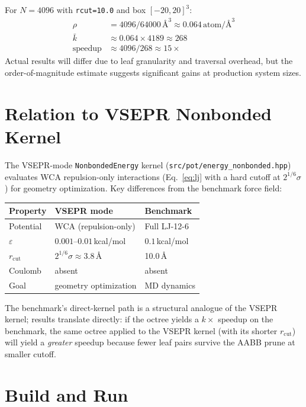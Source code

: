 \documentclass[11pt,a4paper]{article}
\theoremstyle{definition}
\theoremstyle{plain}
\newcommand{\rcut}{r_{\mathrm{cut}}}
\newcommand{\eps}{\varepsilon}
\begin{document}
For $N = 4096$ with \texttt{rcut=10.0} and box $[-20,20]^3$:
\begin{align*}
  \rho &= 4096 / 64000\,\text{\AA}^3 \approx 0.064\,\text{atom/\AA}^3 \\
  \bar{k} &\approx 0.064 \times 4189 \approx 268 \\
  \text{speedup} &\approx 4096 / 268 \approx 15\times
\end{align*}
Actual results will differ due to leaf granularity and traversal overhead,
but the order-of-magnitude estimate suggests significant gains at production
system sizes.

\section{Relation to VSEPR Nonbonded Kernel}
\label{sec:vsepr}

The VSEPR-mode \texttt{NonbondedEnergy} kernel
(\texttt{src/pot/energy\_nonbonded.hpp}) evaluates WCA repulsion-only
interactions (Eq.~\ref{eq:lj} with a hard cutoff at $2^{1/6}\sigma$) for
geometry optimization.  Key differences from the benchmark force field:

\begin{center}
\begin{tabular}{lll}
\toprule
Property & VSEPR mode & Benchmark \\
\midrule
Potential  & WCA (repulsion-only) & Full LJ-12-6 \\
$\eps$     & $0.001$–$0.01$\,kcal/mol & $0.1$\,kcal/mol \\
$\rcut$    & $2^{1/6}\sigma \approx 3.8$\,\AA & 10.0\,\AA \\
Coulomb    & absent & absent \\
Goal       & geometry optimization & MD dynamics \\
\bottomrule
\end{tabular}
\end{center}

The benchmark's direct-kernel path is a structural analogue of the VSEPR
kernel; results translate directly: if the octree yields a $k\times$
speedup on the benchmark, the same octree applied to the VSEPR kernel
(with its shorter $\rcut$) will yield a \emph{greater} speedup because
fewer leaf pairs survive the AABB prune at smaller cutoff.

\section{Build and Run}
\label{sec:build}
\end{document}
